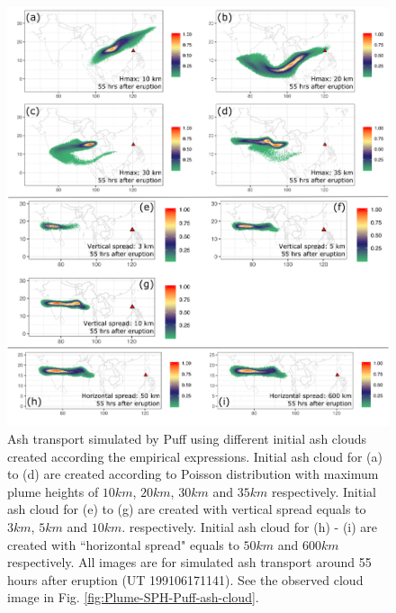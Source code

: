 \documentclass[utf8]{frontiersSCNS} %
\begin{document}
\begin{figure}[!htb]
\centering
\includegraphics[width=0.99 \textwidth]{Figures/discussion}
\caption{Ash transport simulated by Puff using different initial ash clouds created according the empirical expressions. Initial ash cloud for (a) to (d)  are created according to Poisson distribution with maximum plume heights of $10km $, $20km$, $30km$ and $35km$ respectively.  Initial ash cloud for (e) to (g)  are created with vertical spread equals to $3km$, $5km$ and $10km$. respectively.  Initial ash cloud for (h) - (i)  are created with ``horizontal spread" equals to $50 km$ and $600km$ respectively. All images are for simulated ash transport around 55 hours after eruption (UT 199106171141). See the observed cloud image in Fig. \ref{fig:Plume-SPH-Puff-ash-cloud}.}
\label{fig:discussion-initial-ash}
\end{figure}
\end{document}

